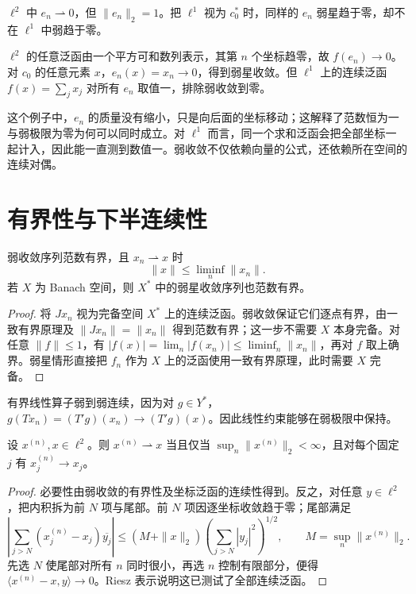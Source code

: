 \begin{example}\label{ex:fa-weak-unit-vectors}
$\ell^2$ 中 $e_n\rightharpoonup0$，但 $\|e_n\|_2=1$。把 $\ell^1$ 视为 $c_0^*$ 时，同样的 $e_n$ 弱星趋于零，却不在 $\ell^1$ 中弱趋于零。
\end{example}
\begin{solve}
$\ell^2$ 的任意泛函由一个平方可和数列表示，其第 $n$ 个坐标趋零，故 $f(e_n)\to0$。对 $c_0$ 的任意元素 $x$，$e_n(x)=x_n\to0$，得到弱星收敛。但 $\ell^1$ 上的连续泛函 $f(x)=\sum_jx_j$ 对所有 $e_n$ 取值一，排除弱收敛到零。
\end{solve}

这个例子中，$e_n$ 的质量没有缩小，只是向后面的坐标移动；这解释了范数恒为一与弱极限为零为何可以同时成立。对 $\ell^1$ 而言，同一个求和泛函会把全部坐标一起计入，因此能一直测到数值一。弱收敛不仅依赖向量的公式，还依赖所在空间的连续对偶。

\section{有界性与下半连续性}
\begin{proposition}\label{prop:fa-weak-bounds}
弱收敛序列范数有界，且 $x_n\rightharpoonup x$ 时
\[
 \|x\|\leq\liminf_n\|x_n\|.
\]
若 $X$ 为 Banach 空间，则 $X^*$ 中的弱星收敛序列也范数有界。
\end{proposition}
\begin{proof}
将 $Jx_n$ 视为完备空间 $X^*$ 上的连续泛函。弱收敛保证它们逐点有界，由一致有界原理及 $\|Jx_n\|=\|x_n\|$ 得到范数有界；这一步不需要 $X$ 本身完备。对任意 $\|f\|\leq1$，有 $|f(x)|=\lim_n|f(x_n)|\leq\liminf_n\|x_n\|$，再对 $f$ 取上确界。弱星情形直接把 $f_n$ 作为 $X$ 上的泛函使用一致有界原理，此时需要 $X$ 完备。
\end{proof}
有界线性算子弱到弱连续，因为对 $g\in Y^*$，$g(Tx_n)=(T'g)(x_n)\to(T'g)(x)$。因此线性约束能够在弱极限中保持。

\begin{proposition}\label{prop:fa-coordinate-weak}
设 $x^{(n)},x\in\ell^2$。则 $x^{(n)}\rightharpoonup x$ 当且仅当 $\sup_n\|x^{(n)}\|_2<\infty$，且对每个固定 $j$ 有 $x_j^{(n)}\to x_j$。
\end{proposition}
\begin{proof}
必要性由弱收敛的有界性及坐标泛函的连续性得到。反之，对任意 $y\in\ell^2$，把内积拆为前 $N$ 项与尾部。前 $N$ 项因逐坐标收敛趋于零；尾部满足
\[
 \left|\sum_{j>N}(x_j^{(n)}-x_j)\overline{y_j}\right|
 \leq(M+\|x\|_2)\left(\sum_{j>N}|y_j|^2\right)^{1/2},
 \qquad M=\sup_n\|x^{(n)}\|_2.
\]
先选 $N$ 使尾部对所有 $n$ 同时很小，再选 $n$ 控制有限部分，便得 $\langle x^{(n)}-x,y\rangle\to0$。Riesz 表示说明这已测试了全部连续泛函。
\end{proof}

